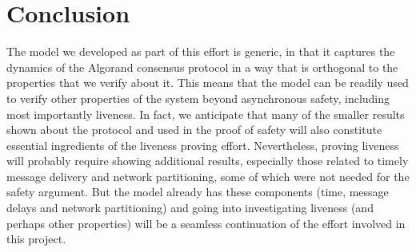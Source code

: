 \section{Conclusion}
\label{sec:conclusion}

The model we developed as part of this effort is generic, in that it captures the dynamics of the Algorand consensus protocol in a way that is orthogonal to the properties that we verify about it. This means that the model can be readily used to verify other properties of the system beyond asynchronous safety, including most importantly liveness. In fact, we anticipate that many of the smaller results shown about the protocol and used in the proof of safety will also constitute essential ingredients of the liveness proving effort. Nevertheless, proving liveness will probably require showing additional results, especially those related to timely message delivery and network partitioning, some of which were not needed for the safety argument. But the model already has these components (time, message delays and network partitioning) and going into investigating liveness (and perhaps other properties) will be a seamless continuation of the effort involved in this project.
